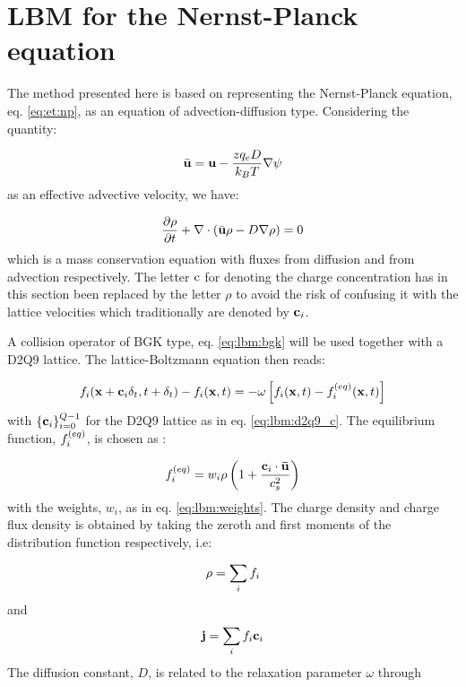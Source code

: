 \section{LBM for the Nernst-Planck equation}\label{sec:lbm:np}
The method presented here is based on representing the Nernst-Planck
equation, eq. \eqref{eq:et:np}, as an equation of advection-diffusion
type. Considering the quantity:  

\begin{equation}\label{eq:lbm:eff_adv}
\bar{\mathbf{u}} = \mathbf{u} -
  \frac{zq_eD}{k_BT}\nabla\mathrm{\psi}
\end{equation}
as an effective advective velocity, we have:

\begin{equation}\label{eq:lbm:adv-dif}
\dfrac{\partial \rho}{\partial t} + \nabla \cdot ( \bar{\mathbf{u}} \rho -
  D\nabla \rho ) = 0
\end{equation}
which is a mass conservation equation with fluxes from diffusion and
from advection respectively. The letter $\mathrm{c}$ for denoting the charge
concentration has in this section been replaced by the letter $\rho$
to avoid the risk of confusing it with the lattice velocities
which traditionally are denoted by ${\mathbf{c}_i}$.

A collision operator of BGK type, eq. \eqref{eq:lbm:bgk} will be used
together with a D2Q9 lattice. The lattice-Boltzmann equation then
reads:

\begin{equation}
f_i(\mathbf{x} + \mathbf{c}_i\delta_t, t + \delta_t) - f_i(\mathbf{x}, t) = -\omega \left[ f_i(\mathbf{x}, t) - f_i^{(eq)}(\mathbf{x}, t) \right]
\end{equation}
with $\{\mathbf{c}_i\}_{i=0}^{Q-1}$ for the D2Q9 lattice as in
eq. \eqref{eq:lbm:d2q9_c}. The equilibrium function, $f_i^{(eq)}$, is chosen
as \cite{alexey-tobias}:

\begin{equation}\label{eq:lbm:np_feq}
f_i^{(eq)} = w_i \rho \left ( 1 + \frac{\mathbf{c}_i \cdot \mathbf{\bar{u}}}{c_s^2} \right)
\end{equation}
with the weights, $w_i$, as in eq. \eqref{eq:lbm:weights}. The charge
density and charge flux density is obtained by taking the zeroth and
first moments of the distribution function respectively, i.e:

\begin{equation}\label{eq:lbm:rho_mom}
\mathrm{\rho} = \sum_i f_i
\end{equation}
and
\begin{equation}\label{eq:lbm:j_mom}
\mathbf{j} = \sum_i f_i \mathbf{c}_i
\end{equation}
The diffusion constant, $D$, is related to the relaxation parameter
$\omega$ through 

